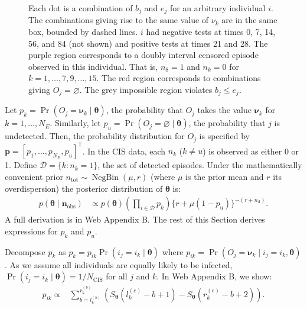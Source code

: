 \documentclass[referee,useAMS,usenatbib]{biom}
\def\dist{\sim}
\DeclareMathOperator{\prob}{\mathrm{Pr}}
\DeclareMathOperator{\NBr}{NegBin}
\newcommand{\NBc}{\NBr}
\newcommand\set{\mathcal}
\renewcommand{\vec}[1]{\bm{#1}}
\newcommand{\ssep}{:}
\newcommand{\ntot}{n_\text{tot}}
\newcommand{\ndet}{n_\text{d}}
\newcommand{\pnodet}{p_\text{u}}
\newcommand{\Ncis}{N_\text{CIS}}
\newcommand{\na}{\vec{n}_\text{obs}}
\begin{document}
\begin{figure}
    
    \caption[Episode regions]{%
      Each dot is a combination of $b_j$ and $e_j$ for an arbitrary individual $i$.
      The combinations giving rise to the same value of $\nu_k$ are in the same box, bounded by dashed lines.
      $i$ had negative tests at times 0, 7, 14, 56, and 84 (not shown) and positive tests at times 21 and 28.
      The purple region corresponds to a doubly interval censored episode observed in this individual.
      That is, $n_8 = 1$ and $n_k = 0$ for $k = 1, \dots, 7, 9, \dots, 15$.
      The red region corresponds to combinations giving $O_j = \varnothing$.
      The grey impossible region violates $b_j \leq e_j$.
    }
    \label{perf-test:fig:partitionSpace}
\end{figure}

Let $p_k = \prob(O_j = \vec{\nu}_k \mid \vec{\theta})$, the probability that $O_j$ takes the value $\vec{\nu}_k$ for $k = 1, \dots, N_E$.
Similarly, let $p_u = \prob(O_j = \varnothing \mid \vec{\theta})$, the probability that $j$ is undetected.
Then, the probability distribution for $O_j$ is specified by $\vec{p} = [p_1, \dots, p_{N_E}, p_u]^{\mathsf{T}}$.
In the CIS data, each $n_k$ ($k \neq u$) is observed as either 0 or 1.
Define $\set{D} = \{ k \ssep n_k = 1 \}$, the set of detected episodes.
Under the mathematically convenient prior $\ntot \dist \NBc(\mu, r)$ (where $\mu$ is the prior mean and $r$ its overdispersion) the posterior distribution of $\vec{\theta}$ is:
\begin{align}
p(\vec{\theta} \mid \na)
&\propto p(\vec{\theta}) \left( \prod_{i \in \set{D}} p_k \right) \{r + \mu (1- \pnodet)\}^{-(r+\ndet)} \label{perf-test:eq:full-posterior}.
\end{align}
A full derivation is in Web Appendix B.
The rest of this Section derives expressions for $p_{k}$ and $p_{u}$.

Decompose $p_k$ as $p_k = p_{ik} \prob(i_j = i_k \mid \vec{\theta})$
where $p_{ik} = \prob(O_j = \vec{\nu}_k \mid i_j = i_k, \vec{\theta})$.
As we assume all individuals are equally likely to be infected, $\prob(i_j = i_k \mid \vec{\theta}) = 1/\Ncis$ for all $j$ and $k$.
In Web Appendix B, we show:
\begin{align}
p_{ik}
\propto& \sum_{b = l_k^{(b)}}^{r_k^{(b)}} \left( S_{\vec{\theta}}(l_k^{(e)} - b + 1) - S_{\vec{\theta}}(r_k^{(e)} - b + 2) \right).
\label{perf-test:eq:pia}
\end{align}
\end{document}
